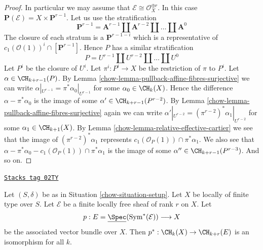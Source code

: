 \begin{proof}
\medskip\noindent
In particular we may assume that $\mathcal{E} \cong \mathcal{O}_X^{\oplus r}$.
In this case $\mathbf{P}(\mathcal{E}) = X \times \mathbf{P}^{r - 1}$.
Let us use the stratification
$$
\mathbf{P}^{r - 1} = \mathbf{A}^{r - 1}
\amalg \mathbf{A}^{r - 2}
\amalg \ldots
\amalg \mathbf{A}^0
$$
The closure of each stratum is a $\mathbf{P}^{r - 1 - i}$ which is a
representative of $c_1(\mathcal{O}(1))^i \cap [\mathbf{P}^{r - 1}]$.
Hence $P$ has a similar stratification
$$
P = U^{r - 1} \amalg U^{r - 2} \amalg \ldots \amalg U^0
$$
Let $P^i$ be the closure of $U^i$. Let $\pi^i : P^i \to X$
be the restriction of $\pi$ to $P^i$.
Let $\alpha \in \CH_{k + r - 1}(P)$. By
Lemma \ref{chow-lemma-pullback-affine-fibres-surjective}
we can write $\alpha|_{U^{r - 1}} = \pi^*\alpha_0|_{U^{r - 1}}$
for some $\alpha_0 \in \CH_k(X)$. Hence the difference
$\alpha - \pi^*\alpha_0$ is the image of some
$\alpha' \in \CH_{k + r - 1}(P^{r - 2})$.
By Lemma \ref{chow-lemma-pullback-affine-fibres-surjective}
again we can write
$\alpha'|_{U^{r - 2}} = (\pi^{r - 2})^*\alpha_1|_{U^{r - 2}}$
for some $\alpha_1 \in \CH_{k + 1}(X)$.
By Lemma \ref{chow-lemma-relative-effective-cartier}
we see that the image of $(\pi^{r - 2})^*\alpha_1$
represents $c_1(\mathcal{O}_P(1)) \cap \pi^*\alpha_1$.
We also see that
$\alpha - \pi^*\alpha_0 - c_1(\mathcal{O}_P(1)) \cap \pi^*\alpha_1$
is the image of some $\alpha'' \in \CH_{k + r - 1}(P^{r - 3})$.
And so on.
\end{proof}

\begin{lemma}[Vectorbundle]
\label{chow-lemma-vectorbundle}
\href{https://stacks.math.columbia.edu/tag/02TY}{\texttt{Stacks tag 02TY}}

Let $(S, \delta)$ be as in Situation \ref{chow-situation-setup}.
Let $X$ be locally of finite type over $S$.
Let $\mathcal{E}$ be a finite locally free sheaf of rank $r$ on $X$.
Let
$$
p :
E = \underline{\Spec}(\text{Sym}^*(\mathcal{E}))
\longrightarrow
X
$$
be the associated vector bundle over $X$.
Then $p^* : \CH_k(X) \to \CH_{k + r}(E)$ is an isomorphism for all $k$.
\end{lemma}

